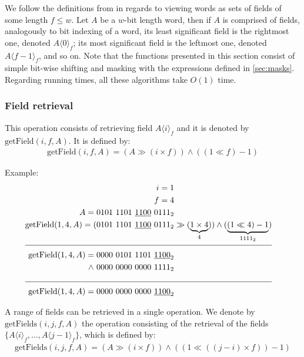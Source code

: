 We follow the definitions from \cite{patrascu2014dynamic} in regards to viewing words as sets of fields of some length $f \leq w$. Let $A$ be a $w$-bit length word, then if $A$ is comprised of fields, analogously to bit indexing of a word, its least significant field is the rightmost one, denoted $A\langle0\rangle_f$; its most significant field is the leftmost one, denoted $A\langle f-1\rangle_f$, and so on.
Note that the functions presented in this section consist of simple bit-wise shifting and masking with the expressions defined in \ref{sec:masks}. Regarding running times, all these algorithms take $O(1)$ time.

\subsubsection{Field retrieval} \label{sec:fieldRetrieval}

This operation consists of retrieving field $A\langle i\rangle_f$ and it is denoted by $\text{getField}(i, f, A)$. It is defined by:
\begin{align*}
    \text{getField}(i, f, A) = (A \gg (i \times f)) \wedge ((1 \ll f) - 1)
\end{align*}

Example:
\begin{align*}
    i = 1\\
    f = 4\\
    A = 0101\ 1101\ \underline{1100}\ 0111_2& \\
    \text{getField}(1, 4, A) = (0101\ 1101\ \underline{1100}\ 0111_2& \gg (\underbrace{1 \times 4}_{4})) \wedge (\underbrace{(1 \ll 4) - 1}_{1111_2})\\
    \cline{1-2}
    \text{getField}(1, 4, A) = 0000\ 0101\ 1101\ \underline{1100}_2& \\
    \wedge\ 0000\ 0000\ 0000\ 1111_2& \\
    \cline{1-2}
    \text{getField}(1, 4, A) = 0000\ 0000\ 0000\ \underline{1100}_2&
\end{align*}

A range of fields can be retrieved in a single operation. We denote by $\text{getFields}(i, j, f, A)$ the operation consisting of the retrieval of the fields $\{A\langle i\rangle_f,\dots , A\langle j-1\rangle_f\}$, which is defined by:
\begin{align*}
    \text{getFields}(i, j, f, A) = (A \gg (i \times f)) \wedge ((1 \ll ((j - i) \times f)) - 1)
\end{align*}

